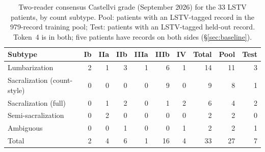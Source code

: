 \documentclass{article}
\begin{document}
\begin{table}[h]
\caption{Two-reader consensus Castellvi grade (September
2026) for the 33 LSTV patients, by count subtype. Pool:
patients with an LSTV-tagged record in the 979-record
training pool; Test: patients with an LSTV-tagged
held-out record. Token~4 is in both; five patients have
records on both sides (\S\ref{sec:baseline}).}
\label{tab:castellvi_dist}
\centering
\small
\setlength{\tabcolsep}{4pt}
\begin{tabular}{lrrrrrrr|rr}
\toprule
\bfseries Subtype & \bfseries Ib & \bfseries IIa & \bfseries IIb & \bfseries IIIa & \bfseries IIIb & \bfseries IV & \bfseries Total & \bfseries Pool & \bfseries Test \\
\midrule
Lumbarization                  & 2 & 1 & 3 & 1 &  6 & 1 & 14 & 11 & 3 \\
Sacralization (count-style)    & 0 & 0 & 0 & 0 &  9 & 0 &  9 &  8 & 1 \\
Sacralization (full)           & 0 & 1 & 2 & 0 &  1 & 2 &  6 &  4 & 2 \\
Semi-sacralization             & 0 & 2 & 0 & 0 &  0 & 0 &  2 &  2 & 0 \\
Ambiguous                      & 0 & 0 & 1 & 0 &  0 & 1 &  2 &  2 & 1 \\
\midrule
Total                          & 2 & 4 & 6 & 1 & 16 & 4 & 33 & 27 & 7 \\
\bottomrule
\end{tabular}
\end{table}
\end{document}
